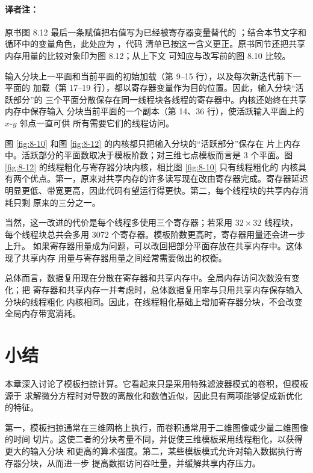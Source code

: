 \paragraph{译者注：}原书图 8.12 最后一条赋值把右值写为已经被寄存器变量替代的
；结合本节文字和循环中的变量角色，此处应为 ，代码
清单已按这一含义更正。原书同节还把共享内存用量的比较对象印为图 8.12；从上下文
可知应与改写前的图 8.10 比较。

输入分块上一平面和当前平面的初始加载（第 9--15 行），以及每次新迭代前下一平面的
加载（第 17--19 行），都以寄存器变量作为目的位置。因此，输入分块“活跃部分”的
三个平面分散保存在同一线程块各线程的寄存器中。内核还始终在共享内存中保存输入
分块当前平面的一个副本（第 14、36 行），使活跃输入平面上的 $x$-$y$ 邻点一直可供
所有需要它们的线程访问。

图 \ref{fig:8-10} 和图 \ref{fig:8-12} 的内核都只把输入分块的“活跃部分”保存在
片上内存中。活跃部分的平面数取决于模板阶数；对三维七点模板而言是 3 个平面。图
\ref{fig:8-12} 的线程粗化与寄存器分块内核，相比图 \ref{fig:8-10} 只有线程粗化的
内核具有两个优点。第一，原来对共享内存的许多读写现在改由寄存器完成。寄存器延迟
明显更低、带宽更高，因此代码有望运行得更快。第二，每个线程块的共享内存消耗只剩
原来的三分之一。

当然，这一改进的代价是每个线程多使用三个寄存器；若采用 $32\times32$ 线程块，
每个线程块总共会多用 3072 个寄存器。模板阶数更高时，寄存器用量还会进一步上升。
如果寄存器用量成为问题，可以改回把部分平面存放在共享内存中。这体现了共享内存
用量与寄存器用量之间经常需要做出的权衡。

总体而言，数据复用现在分散在寄存器和共享内存中。全局内存访问次数没有变化；把
寄存器和共享内存一并考虑时，总体数据复用率与只用共享内存保存输入分块的线程粗化
内核相同。因此，在线程粗化基础上增加寄存器分块，不会改变全局内存带宽消耗。

\section{小结}
\label{sec:stencil-summary}

本章深入讨论了模板扫掠计算。它看起来只是采用特殊滤波器模式的卷积，但模板源于
求解微分方程时对导数的离散化和数值近似，因此具有两项能够促成新优化的特征。

第一，模板扫掠通常在三维网格上执行，而卷积通常用于二维图像或少量二维图像的时间
切片。这使二者的分块考量不同，并促使三维模板采用线程粗化，以获得更大的输入分块
和更高的算术强度。第二，某些模板模式允许对输入数据执行寄存器分块，从而进一步
提高数据访问吞吐量，并缓解共享内存压力。

